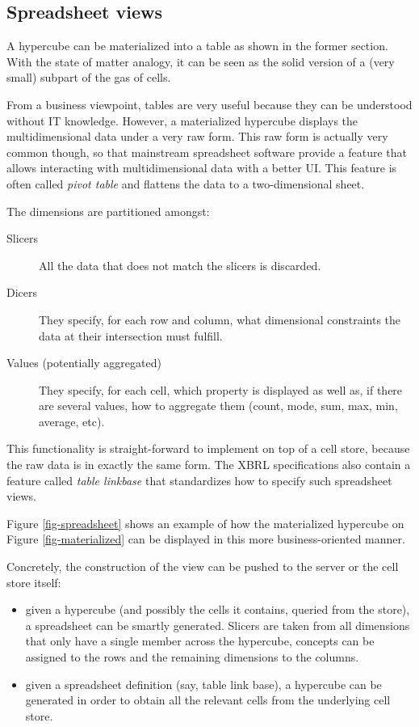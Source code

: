 \documentclass{acm_proc_article-sp}
\begin{document}
\subsection{Spreadsheet views}

A hypercube can be materialized into a table as shown in the former section. With the state of matter analogy, it can be seen as the solid version of a (very small) subpart of the gas of cells.

From a business viewpoint, tables are very useful because they can be understood without IT knowledge. However, a materialized hypercube displays the multidimensional data under a very raw form. This raw form is actually very common though, so that mainstream spreadsheet software provide a feature that allows interacting with multidimensional data with a better UI. This feature is often called \emph{pivot table} and flattens the data to a two-dimensional sheet.

The dimensions are partitioned amongst:
\begin{description}
\item [Slicers] All the data that does not match the slicers is discarded.
\item [Dicers] They specify, for each row and column, what dimensional constraints the data at their intersection must fulfill.
\item [Values (potentially aggregated)] They specify, for each cell, which property is displayed as well as, if there are several values, how to aggregate them (count, mode, sum, max, min, average, etc).
\end{description}

This functionality is straight-forward to implement on top of a cell store, because the raw data is in exactly the same form. The XBRL specifications also contain a feature called \emph{table linkbase} that standardizes how to specify such spreadsheet views.

Figure \ref{fig-spreadsheet} shows an example of how the materialized hypercube on Figure \ref{fig-materialized} can be displayed in this more business-oriented manner.

Concretely, the construction of the view can be pushed to the server or the cell store itself:

\begin{itemize}
\item given a hypercube (and possibly the cells it contains, queried from the store), a spreadsheet can be smartly generated. Slicers are taken from all dimensions that only have a single member across the hypercube, concepts can be assigned to the rows and the remaining dimensions to the columns.
\item given a spreadsheet definition (say, table link base), a hypercube can be generated in order to obtain all the relevant cells from the underlying cell store.
\end{itemize}
\end{document}

